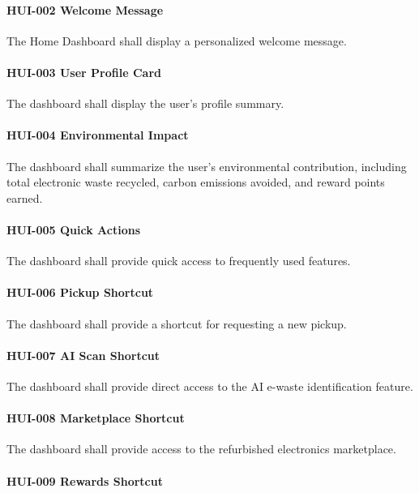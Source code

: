 \paragraph{HUI-002 Welcome Message}

The Home Dashboard shall display a personalized welcome message.

\paragraph{HUI-003 User Profile Card}

The dashboard shall display the user's profile summary.

\paragraph{HUI-004 Environmental Impact}

The dashboard shall summarize the user's environmental contribution,
including total electronic waste recycled, carbon emissions avoided,
and reward points earned.

\paragraph{HUI-005 Quick Actions}

The dashboard shall provide quick access to frequently used features.

\paragraph{HUI-006 Pickup Shortcut}

The dashboard shall provide a shortcut for requesting a new pickup.

\paragraph{HUI-007 AI Scan Shortcut}

The dashboard shall provide direct access to the AI e-waste
identification feature.

\paragraph{HUI-008 Marketplace Shortcut}

The dashboard shall provide access to the refurbished electronics
marketplace.

\paragraph{HUI-009 Rewards Shortcut}

